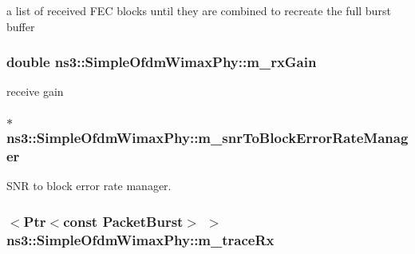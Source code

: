 a list of received F\+EC blocks until they are combined to recreate the full burst buffer 

\subsubsection[{\texorpdfstring{m\+\_\+rx\+Gain}{m_rxGain}}]{\setlength{\rightskip}{0pt plus 5cm}double ns3\+::\+Simple\+Ofdm\+Wimax\+Phy\+::m\+\_\+rx\+Gain\hspace{0.3cm}{\ttfamily [private]}}\hypertarget{classns3_1_1SimpleOfdmWimaxPhy_a40fbda9beb958e00d6ad721feedaf7d5}{}\label{classns3_1_1SimpleOfdmWimaxPhy_a40fbda9beb958e00d6ad721feedaf7d5}


receive gain 

\subsubsection[{\texorpdfstring{m\+\_\+snr\+To\+Block\+Error\+Rate\+Manager}{m_snrToBlockErrorRateManager}}]{$\ast$ ns3\+::\+Simple\+Ofdm\+Wimax\+Phy\+::m\+\_\+snr\+To\+Block\+Error\+Rate\+Manager\hspace{0.3cm}{\ttfamily [private]}}\hypertarget{classns3_1_1SimpleOfdmWimaxPhy_a84b79db3c0e61c0797765a154c50c24e}{}\label{classns3_1_1SimpleOfdmWimaxPhy_a84b79db3c0e61c0797765a154c50c24e}


S\+NR to block error rate manager. 

\subsubsection[{\texorpdfstring{m\+\_\+trace\+Rx}{m_traceRx}}]{$<${\bf Ptr}$<$const {\bf Packet\+Burst}$>$ $>$ ns3\+::\+Simple\+Ofdm\+Wimax\+Phy\+::m\+\_\+trace\+Rx\hspace{0.3cm}{\ttfamily [private]}}\hypertarget{classns3_1_1SimpleOfdmWimaxPhy_af98beb50419576fec304794528811af7}{}\label{classns3_1_1SimpleOfdmWimaxPhy_af98beb50419576fec304794528811af7}


